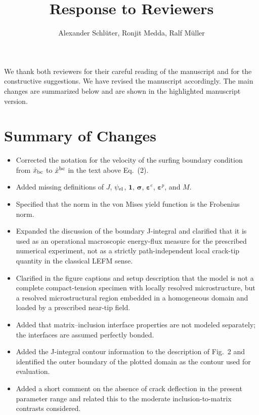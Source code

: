 \documentclass[a4paper,11pt]{article}
\title{Response to Reviewers}
\author{Alexander Schl\"uter, Ronjit Medda, Ralf M\"uller}
\date{}
\begin{document}
\maketitle

\setlength{\parindent}{0pt}
\setlength{\parskip}{0.55\baselineskip}

We thank both reviewers for their careful reading of the manuscript
and for the constructive suggestions. We have revised the manuscript
accordingly. The main changes are summarized below and are shown in
the highlighted manuscript version.

\section*{Summary of Changes}

\begin{itemize}
  \item Corrected the notation for the velocity of the surfing
  boundary condition from \(\dot{x}_{\rm bc}\) to
  \(\dot{x}^{\rm bc}\) in the text above Eq.~(2).
  \item Added missing definitions of \(J\), \(\psi_{\rm el}\),
  \(\boldsymbol{1}\), \(\boldsymbol{\sigma}\),
  \(\boldsymbol{\varepsilon}^e\),
  \(\boldsymbol{\varepsilon}^p\), and \(M\).
  \item Specified that the norm in the von Mises yield function is
  the Frobenius norm.
  \item Expanded the discussion of the boundary J-integral and
  clarified that it is used as an operational macroscopic energy-flux
  measure for the prescribed numerical experiment, not as a strictly
  path-independent local crack-tip quantity in the classical LEFM
  sense.
  \item Clarified in the figure captions and setup description that
  the model is not a complete compact-tension specimen with locally
  resolved microstructure, but a resolved microstructural region
  embedded in a homogeneous domain and loaded by a prescribed
  near-tip field.
  \item Added that matrix--inclusion interface properties are not
  modeled separately; the interfaces are assumed perfectly bonded.
  \item Added the J-integral contour information to the description
  of Fig.~2 and identified the outer boundary of the plotted domain
  as the contour used for evaluation.
  \item Added a short comment on the absence of crack deflection in
  the present parameter range and related this to the moderate
  inclusion-to-matrix contrasts considered.
\end{itemize}
\end{document}
